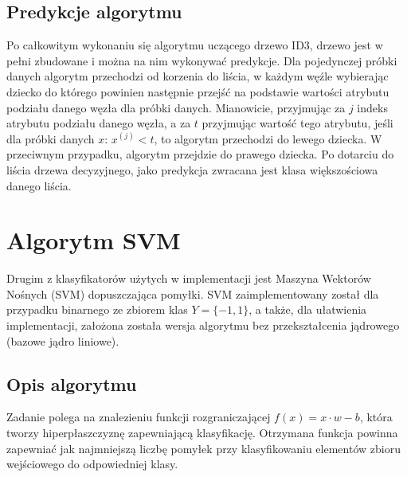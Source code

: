 \documentclass[
    left=2.5cm,         %
    right=2.5cm,        %
    top=2.5cm,          %
    bottom=3cm,         %
    bindingoffset=6mm,  %
    nohyphenation=false %
]{eiti/eiti-report}
\begin{document}
\subsection{Predykcje algorytmu}
Po całkowitym wykonaniu się algorytmu uczącego drzewo ID3, drzewo jest w pełni zbudowane i można na nim wykonywać predykcje. Dla pojedynczej próbki danych algorytm przechodzi od korzenia do liścia, w każdym węźle wybierając dziecko do którego powinien następnie przejść na podstawie wartości atrybutu podziału danego węzła dla próbki danych. Mianowicie, przyjmując za $j$ indeks atrybutu podziału danego węzła, a za $t$ przyjmując wartość tego atrybutu, jeśli dla próbki danych $x$: \begin{math}
    x^{(j)} < t
\end{math}, to algorytm przechodzi do lewego dziecka. W przeciwnym przypadku, algorytm przejdzie do prawego dziecka. Po dotarciu do liścia drzewa decyzyjnego, jako predykcja zwracana jest klasa większościowa danego liścia.


\section{Algorytm SVM}
Drugim z klasyfikatorów użytych w implementacji jest Maszyna Wektorów Nośnych (SVM) dopuszczająca pomyłki. SVM zaimplementowany został dla przypadku binarnego ze zbiorem klas $Y=\{-1,1\}$, a także, dla ułatwienia implementacji, założona została wersja algorytmu bez przekształcenia jądrowego (bazowe jądro liniowe).

\subsection{Opis algorytmu}
Zadanie polega na znalezieniu funkcji rozgraniczającej $ f(x)={x\cdot w-b} $, która tworzy hiperpłaszczyznę zapewniającą klasyfikację. Otrzymana funkcja powinna zapewniać jak najmniejszą liczbę pomyłek przy klasyfikowaniu elementów zbioru wejściowego do odpowiedniej klasy.
\end{document}
